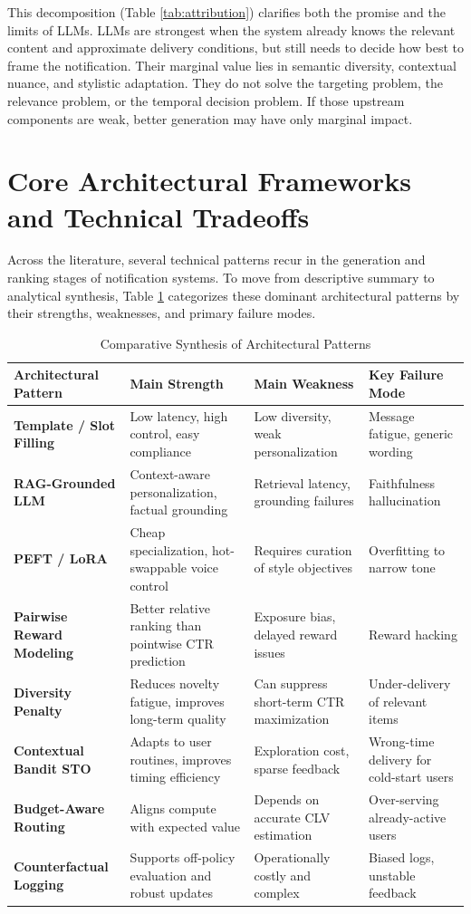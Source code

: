 \documentclass[sigconf]{acmart}
\begin{document}
This decomposition (Table \ref{tab:attribution}) clarifies both the promise and the limits of LLMs. LLMs are strongest when the system already knows the relevant content and approximate delivery conditions, but still needs to decide how best to frame the notification. Their marginal value lies in semantic diversity, contextual nuance, and stylistic adaptation. They do not solve the targeting problem, the relevance problem, or the temporal decision problem. If those upstream components are weak, better generation may have only marginal impact.

\section{Core Architectural Frameworks and Technical Tradeoffs}

Across the literature, several technical patterns recur in the generation and ranking stages of notification systems. To move from descriptive summary to analytical synthesis, Table \ref{tab:synthesis} categorizes these dominant architectural patterns by their strengths, weaknesses, and primary failure modes.

\begin{table}[t]
\caption{Comparative Synthesis of Architectural Patterns}
\label{tab:synthesis}
\begin{tabular}{p{3cm}p{4cm}p{4cm}p{3cm}}
\toprule
\textbf{Architectural Pattern} & \textbf{Main Strength} & \textbf{Main Weakness} & \textbf{Key Failure Mode} \\
\midrule
\textbf{Template / Slot Filling} & Low latency, high control, easy compliance & Low diversity, weak personalization & Message fatigue, generic wording \\
\textbf{RAG-Grounded LLM} & Context-aware personalization, factual grounding & Retrieval latency, grounding failures & Faithfulness hallucination \\
\textbf{PEFT / LoRA} & Cheap specialization, hot-swappable voice control & Requires curation of style objectives & Overfitting to narrow tone \\
\textbf{Pairwise Reward Modeling} & Better relative ranking than pointwise CTR prediction & Exposure bias, delayed reward issues & Reward hacking \\
\textbf{Diversity Penalty} & Reduces novelty fatigue, improves long-term quality & Can suppress short-term CTR maximization & Under-delivery of relevant items \\
\textbf{Contextual Bandit STO} & Adapts to user routines, improves timing efficiency & Exploration cost, sparse feedback & Wrong-time delivery for cold-start users \\
\textbf{Budget-Aware Routing} & Aligns compute with expected value & Depends on accurate CLV estimation & Over-serving already-active users \\
\textbf{Counterfactual Logging} & Supports off-policy evaluation and robust updates & Operationally costly and complex & Biased logs, unstable feedback \\
\bottomrule
\end{tabular}
\end{table}
\end{document}
